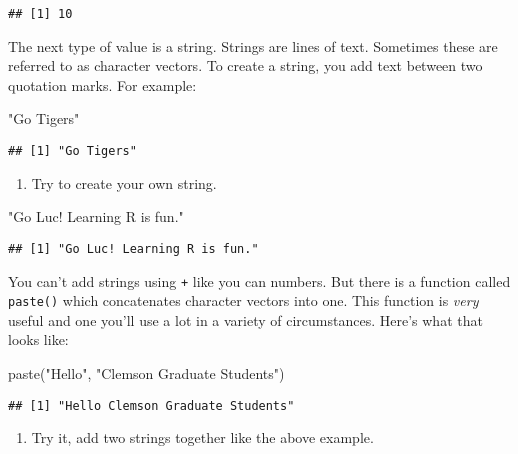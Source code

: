 \documentclass[
]{article}
\newenvironment{Shaded}{\begin{snugshade}}{\end{snugshade}}
\newcommand{\FunctionTok}[1]{\textcolor[rgb]{0.00,0.00,0.00}{#1}}
\newcommand{\NormalTok}[1]{#1}
\newcommand{\StringTok}[1]{\textcolor[rgb]{0.31,0.60,0.02}{#1}}
\providecommand{\tightlist}{%
  \setlength{\itemsep}{0pt}\setlength{\parskip}{0pt}}
\begin{document}
\begin{verbatim}
## [1] 10
\end{verbatim}

The next type of value is a string. Strings are lines of text. Sometimes
these are referred to as character vectors. To create a string, you add
text between two quotation marks. For example:

\begin{Shaded}
\begin{Highlighting}[]
\StringTok{"Go Tigers"}
\end{Highlighting}
\end{Shaded}

\begin{verbatim}
## [1] "Go Tigers"
\end{verbatim}

\begin{enumerate}
\def\labelenumi{(\arabic{enumi})}
\setcounter{enumi}{2}
\tightlist
\item
  Try to create your own string.
\end{enumerate}

\begin{Shaded}
\begin{Highlighting}[]
\StringTok{"Go Luc! Learning R is fun."}
\end{Highlighting}
\end{Shaded}

\begin{verbatim}
## [1] "Go Luc! Learning R is fun."
\end{verbatim}

You can't add strings using \texttt{+} like you can numbers. But there
is a function called \texttt{paste()} which concatenates character
vectors into one. This function is \emph{very} useful and one you'll use
a lot in a variety of circumstances. Here's what that looks like:

\begin{Shaded}
\begin{Highlighting}[]
\FunctionTok{paste}\NormalTok{(}\StringTok{"Hello"}\NormalTok{, }\StringTok{"Clemson Graduate Students"}\NormalTok{)}
\end{Highlighting}
\end{Shaded}

\begin{verbatim}
## [1] "Hello Clemson Graduate Students"
\end{verbatim}

\begin{enumerate}
\def\labelenumi{(\arabic{enumi})}
\setcounter{enumi}{3}
\tightlist
\item
  Try it, add two strings together like the above example.
\end{enumerate}
\end{document}

